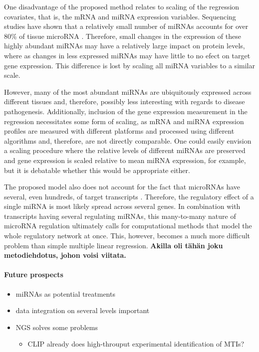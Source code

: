 One disadvantage of the proposed method relates to scaling of the regression
covariates, that is, the mRNA and miRNA expression variables. Sequencing studies have shown
that a relatively small number of miRNAs accounts for over 80\% of tissue microRNA
\citep{Landgraf2007}. Therefore, small changes in the expression of these highly
abundant miRNAs may have a relatively large impact on protein levels, where as
changes in less expressed miRNAs may have little to no efect on target gene
expression. This difference is lost by scaling all miRNA variables to a similar scale.

However, many of the most abundant miRNAs are ubiquitously expressed across
different tissues \citep{Landgraf2007} and, therefore, possibly less
interesting with regards to disease pathogenesis. Additionally, inclusion of
the gene expression measurement in the regression necessitates some form of
scaling, as mRNA and miRNA expression profiles are measured with different platforms
and processed using different algorithms and, therefore, are not directly
comparable. One could easily envision a scaling procedure where the relative
levels of different miRNAs are preserved and gene expression is scaled
relative to mean miRNA expression, for example, but it is debatable whether
this would be appropriate either.

The proposed model also does not account for the fact that microRNAs have
several, even hundreds, of target transcripts \citep{}. Therefore, the regulatory
effect of a single miRNA is most likely spread across several genes. In
combination with transcripts having several regulating miRNAs, this many-to-many
nature of microRNA regulation ultimately calls for computational methods
that model the whole regulatory network at once. This, however, becomes a much
more difficult problem than simple multiple linear regression. \textbf{Akilla
oli tähän joku metodiehdotus, johon voisi viitata.}

\paragraph{Future prospects}

\begin{itemize}
	\item miRNAs as potential treatments
	\item data integration on several levels important
	\item NGS solves some problems
	\begin{itemize}
		\item CLIP already does high-throuput experimental identification of MTIs?
	\end{itemize}
\end{itemize}

